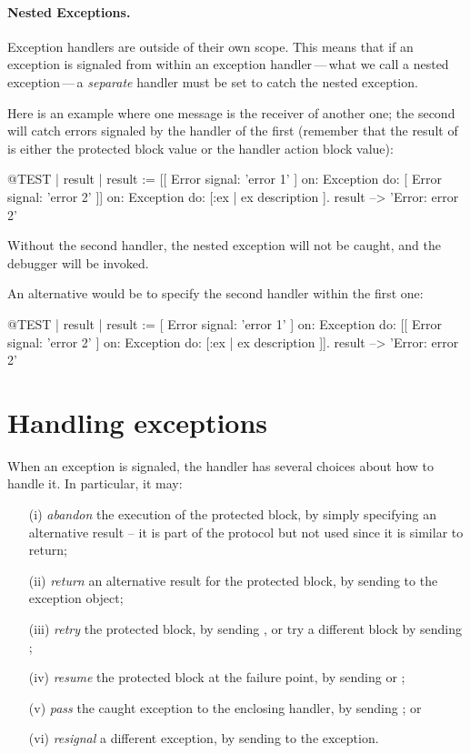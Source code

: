 \documentclass[a4paper,10pt,twoside]{book}
\begin{document}
\paragraph{Nested Exceptions.}
Exception handlers are outside of their own scope.  This means that if an exception is signaled from within an exception handler\,---\,what we call a nested exception\,---\,a \emph{separate} handler must be set to catch the nested exception.

Here is an example where one  message is the receiver of another one; the second will catch errors signaled by the handler of the first (remember that the result of  is either the protected block value or the handler action block value):
\begin{code}{@TEST | result |}
result := [[ Error signal: 'error 1' ]
	on: Exception
	do: [ Error signal: 'error 2' ]]
		on: Exception
		do: [:ex | ex description ].
result --> 'Error: error 2'
\end{code}

Without the second handler, the nested exception will not be caught, and the debugger will be invoked.

An alternative would be to specify the second handler within the first one:
\begin{code}{@TEST | result |}
result := [ Error signal: 'error 1' ]
	on: Exception
	do: [[ Error signal: 'error 2' ]
		on: Exception
		do: [:ex | ex description ]].
result --> 'Error: error 2'
\end{code}

\section{Handling exceptions}

When an exception is signaled, the handler has several choices about how to handle it.
In particular, it may:
\begin{itemize}
\item[(i)] \emph{abandon} the execution of the protected block, by simply specifying an alternative result -- it is part of the protocol but not used since it is similar to return; 
\item[(ii)] \emph{return} an alternative result for the protected block, by sending  to the exception object;
\item[(iii)] \emph{retry} the protected block, by sending , or try a different block by sending ;
\item[(iv)] \emph{resume} the protected block at the failure point, by sending  or ;
\item[(v)] \emph{pass} the caught exception to the enclosing handler, by sending ; or
\item[(vi)] \emph{resignal} a different exception, by sending  to the exception.
\end{itemize}
\end{document}
